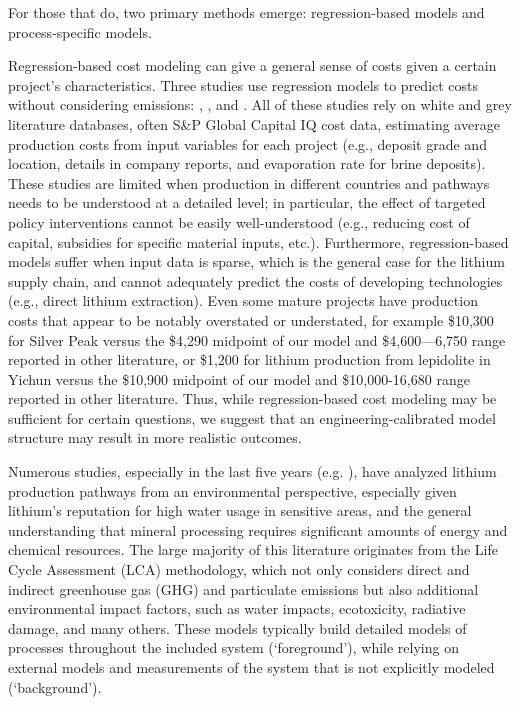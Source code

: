 For those that do, two primary methods emerge: regression-based models and process-specific models.

Regression-based cost modeling can give a general sense of costs given a certain project's characteristics. Three studies use regression models to predict costs without considering emissions: \citet{ambroseUnderstandingFutureLithium2020a}, \citet{flemingLongrunAvailabilityMineral2024}, and \citet{zhouImplicationsUncertaintiesGlobal2026}. All of these studies rely on white and grey literature databases, often S\&P Global Capital IQ cost data, estimating average production costs from input variables for each project (e.g., deposit grade and location, details in company reports, and evaporation rate for brine deposits). These studies are limited when production in different countries and pathways needs to be understood at a detailed level; in particular, the effect of targeted policy interventions cannot be easily well-understood (e.g., reducing cost of capital, subsidies for specific material inputs, etc.). Furthermore, regression-based models suffer when input data is sparse, which is the general case for the lithium supply chain, and cannot adequately predict the costs of developing technologies (e.g., direct lithium extraction). Even some mature projects have production costs that appear to be notably overstated or understated, for example \$10,300 for Silver Peak \cite{zhouImplicationsUncertaintiesGlobal2026, ambroseUnderstandingFutureLithium2020a} versus the \$4,290 midpoint of our model and \$4,600---6,750 range reported in other literature, or \$1,200 for lithium production from lepidolite in Yichun versus the \$10,900 midpoint of our model and \$10,000-16,680 range reported in other literature. Thus, while regression-based cost modeling may be sufficient for certain questions, we suggest that an engineering-calibrated model structure may result in more realistic outcomes. 

Numerous studies, especially in the last five years (e.g. \cite{chordiaLifeCycleEnvironmental2022, schenkerLithiumGeothermalBrines2024, khakmardanComparativeLifeCycle2023, iyerLifecycleAnalysisLithium2024, kellyEnergyGreenhouseGas2021, mousavinezhadEnvironmentalImpactAssessment2024, jiangEnvironmentalImpactsLithium2020, nikfarUnlockingSustainableLithium2025}), have analyzed lithium production pathways from an environmental perspective, especially given lithium's reputation for high water usage in sensitive areas, and the general understanding that mineral processing requires significant amounts of energy and chemical resources. The large majority of this literature originates from the Life Cycle Assessment (LCA) methodology, which not only considers direct and indirect greenhouse gas (GHG) and particulate emissions but also additional environmental impact factors, such as water impacts, ecotoxicity, radiative damage, and many others. These models typically build detailed models of processes throughout the included system (`foreground'), while relying on external models and measurements of the system that is not explicitly modeled (`background').

